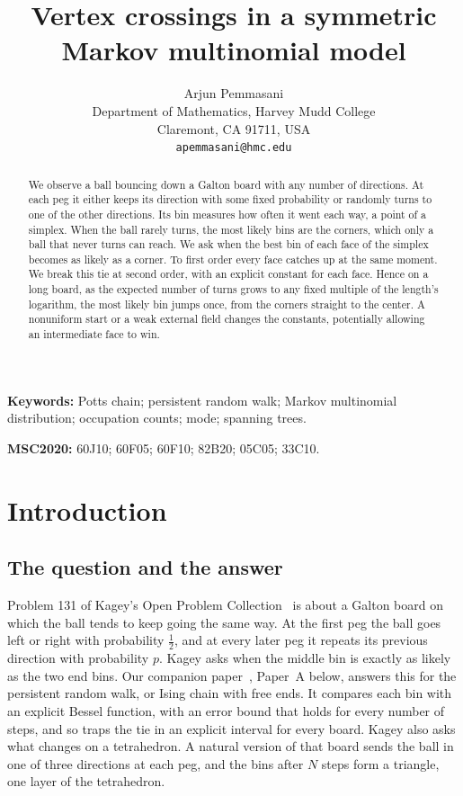 \documentclass[11pt]{article}
\title{Vertex crossings in a symmetric Markov multinomial model}
\author{Arjun Pemmasani\\[2pt]
 \small Department of Mathematics, Harvey Mudd College\\
 \small Claremont, CA 91711, USA\\
 \small \texttt{apemmasani@hmc.edu}}
\date{}
\theoremstyle{definition}
\theoremstyle{remark}
\begin{document}
\maketitle

\begin{abstract}
We observe a ball bouncing down a Galton board with any number of directions. At each peg
it either keeps its direction with some fixed probability or randomly turns to one of
the other directions. Its bin measures how often it went each way, a
point of a simplex. When the ball rarely turns, the most likely bins are the
corners, which only a ball that never turns can reach. We ask when the best bin
of each face of the simplex becomes as likely as a corner. To first order every
face catches up at the same moment. We break this tie at second order, with an
explicit constant for each face. Hence on a long board, as the expected number of
turns grows to any fixed multiple of the length's logarithm, the most
likely bin jumps once, from the corners straight to the center. A nonuniform start or a weak external field changes the constants, potentially allowing an
intermediate face to win.
\end{abstract}

\medskip
\noindent\textbf{Keywords:} Potts chain; persistent random walk; Markov
multinomial distribution; occupation counts; mode; spanning trees.

\noindent\textbf{MSC2020:} 60J10; 60F05; 60F10; 82B20; 05C05; 33C10.

\section{Introduction}\label{sec:intro}

\subsection{The question and the answer}\label{sec:question}

Problem 131 of Kagey's Open Problem Collection~\cite{kagey131} is about a
Galton board on which the ball tends to keep going the same way. At the first
peg the ball goes left or right with probability $\frac12$, and at every later
peg it repeats its previous direction with probability $p$. Kagey asks when the
middle bin is exactly as likely as the two end bins. Our companion
paper~\cite{paperA}, Paper~A below, answers this for the persistent random walk,
or Ising chain with free ends. It compares each bin with an explicit Bessel
function, with an error bound that holds for every number of steps, and so traps
the tie in an explicit interval for every board. Kagey also asks what changes on
a tetrahedron. A natural version of that board sends the ball in one of three
directions at each peg, and the bins after $N$ steps form a triangle, one layer
of the tetrahedron.
\end{document}
